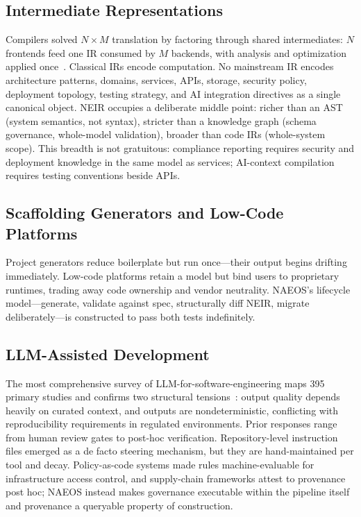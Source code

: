 \documentclass[sigconf,nonacm]{acmart}
\begin{document}
\subsection{Intermediate Representations}
Compilers solved $N{\times}M$ translation by factoring through shared intermediates: $N$ frontends feed one IR consumed by $M$ backends, with analysis and optimization applied once~\cite{lattner2004llvm}. Classical IRs encode computation. No mainstream IR encodes architecture patterns, domains, services, APIs, storage, security policy, deployment topology, testing strategy, and AI integration directives as a single canonical object. NEIR occupies a deliberate middle point: richer than an AST (system semantics, not syntax), stricter than a knowledge graph (schema governance, whole-model validation), broader than code IRs (whole-system scope). This breadth is not gratuitous: compliance reporting requires security and deployment knowledge in the same model as services; AI-context compilation requires testing conventions beside APIs.

\subsection{Scaffolding Generators and Low-Code Platforms}
Project generators reduce boilerplate but run once---their output begins drifting immediately. Low-code platforms retain a model but bind users to proprietary runtimes, trading away code ownership and vendor neutrality. NAEOS's lifecycle model---generate, validate against spec, structurally diff NEIR, migrate deliberately---is constructed to pass both tests indefinitely.

\subsection{LLM-Assisted Development}
The most comprehensive survey of LLM-for-software-engineering maps 395 primary studies and confirms two structural tensions~\cite{hou2024llm4se}: output quality depends heavily on curated context, and outputs are nondeterministic, conflicting with reproducibility requirements in regulated environments. Prior responses range from human review gates to post-hoc verification. Repository-level instruction files emerged as a de facto steering mechanism, but they are hand-maintained per tool and decay. Policy-as-code systems made rules machine-evaluable for infrastructure access control, and supply-chain frameworks attest to provenance post hoc; NAEOS instead makes governance executable within the pipeline itself and provenance a queryable property of construction.
\end{document}
